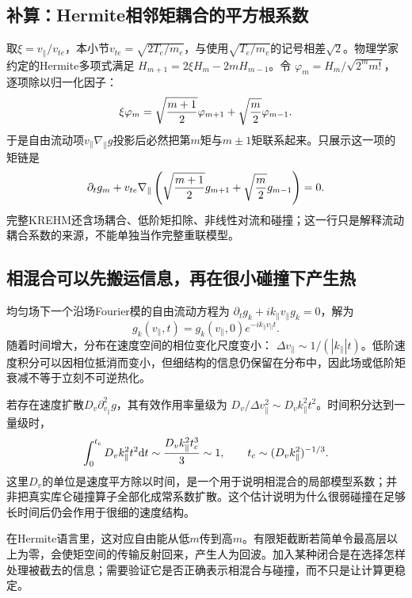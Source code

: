 \documentclass[UTF8,a4paper,11pt,openany,fontset=fandol]{ctexbook}
\begin{document}
\subsection{补算：Hermite相邻矩耦合的平方根系数}
取$\xi=v_\parallel/v_{te}$，本小节$v_{te}=\sqrt{2T_e/m_e}$，与使用$\sqrt{T_e/m_e}$的记号相差$\sqrt2$。物理学家约定的Hermite多项式满足
$H_{m+1}=2\xi H_m-2mH_{m-1}$。令
$\varphi_m=H_m/\sqrt{2^m m!}$，逐项除以归一化因子：
\begin{equation}
 \xi\varphi_m=
 \sqrt{{m+1\over2}}\varphi_{m+1}
 +\sqrt{{m\over2}}\varphi_{m-1}.
\end{equation}
于是自由流动项$v_\parallel\nabla_\parallel g$投影后必然把第$m$矩与$m\pm1$矩联系起来。只展示这一项的矩链是
\begin{equation}
 \partial_tg_m+
 v_{te}\nabla_\parallel
 \left(\sqrt{{m+1\over2}}g_{m+1}
       +\sqrt{{m\over2}}g_{m-1}\right)=0.
\end{equation}
完整KREHM还含场耦合、低阶矩扣除、非线性对流和碰撞；这一行只是解释流动耦合系数的来源，不能单独当作完整重联模型。

\subsection{相混合可以先搬运信息，再在很小碰撞下产生热}
均匀场下一个沿场Fourier模的自由流动方程为
$\partial_tg_k+ik_\parallel v_\parallel g_k=0$，解为
\begin{equation}
 g_k(v_\parallel,t)=g_k(v_\parallel,0)
 e^{-ik_\parallel v_\parallel t}.
\end{equation}
随着时间增大，分布在速度空间的相位变化尺度变小：
$\Delta v_\parallel\sim1/(|k_\parallel|t)$。低阶速度积分可以因相位抵消而变小，但细结构的信息仍保留在分布中，因此场或低阶矩衰减不等于立刻不可逆热化。

若存在速度扩散$D_v\partial_{v_\parallel}^2g$，其有效作用率量级为
$D_v/\Delta v_\parallel^2\sim D_vk_\parallel^2t^2$。时间积分达到一量级时，
\begin{equation}
 \int_0^{t_c}D_vk_\parallel^2t^2\mathrm d t
 \sim{D_vk_\parallel^2t_c^3\over3}\sim1,
 \qquad t_c\sim(D_vk_\parallel^2)^{-1/3}.
\end{equation}
这里$D_v$的单位是速度平方除以时间，是一个用于说明相混合的局部模型系数；并非把真实库仑碰撞算子全部化成常系数扩散。这个估计说明为什么很弱碰撞在足够长时间后仍会作用于很细的速度结构。

在Hermite语言里，这对应自由能从低$m$传到高$m$。有限矩截断若简单令最高层以上为零，会使矩空间的传输反射回来，产生人为回波。加入某种闭合是在选择怎样处理被截去的信息；需要验证它是否正确表示相混合与碰撞，而不只是让计算更稳定。
\end{document}
